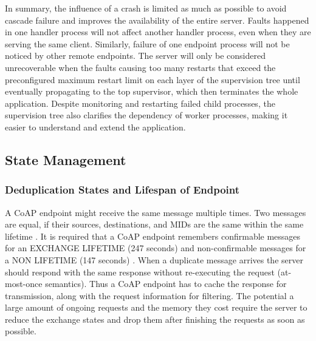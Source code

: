 In summary, the influence of a crash is limited as much as possible to avoid cascade failure and improves the availability of the entire server. Faults happened in one handler process will not affect another handler process, even when they are serving the same client. Similarly, failure of one endpoint process will not be noticed by other remote endpoints. The server will only be considered unrecoverable when the faults causing too many restarts that exceed the preconfigured maximum restart limit on each layer of the supervision tree until eventually propagating to the top supervisor, which then terminates the whole application. Despite monitoring and restarting failed child processes, the supervision tree also clarifies the dependency of worker processes, making it easier to understand and extend the application.

\subsection{State Management}\label{state_management}

\subsubsection{Deduplication States and Lifespan of Endpoint}

A CoAP endpoint might receive the same message multiple times. Two messages are equal, if their sources, destinations, and MIDs are the same within the same lifetime \autocite{lanter2013scalability}. It is required that a CoAP endpoint remembers confirmable messages for an EXCHANGE LIFETIME (247 seconds) and non-confirmable messages for a NON LIFETIME (147 seconds) \autocite{coap_protocol}. When a duplicate message arrives the server should respond with the same response without re-executing the request (at-most-once semantics). Thus a CoAP endpoint has to cache the response for transmission, along with the request information for filtering. The potential a large amount of ongoing requests and the memory they cost require the server to reduce the exchange states and drop them after finishing the requests as soon as possible. 


